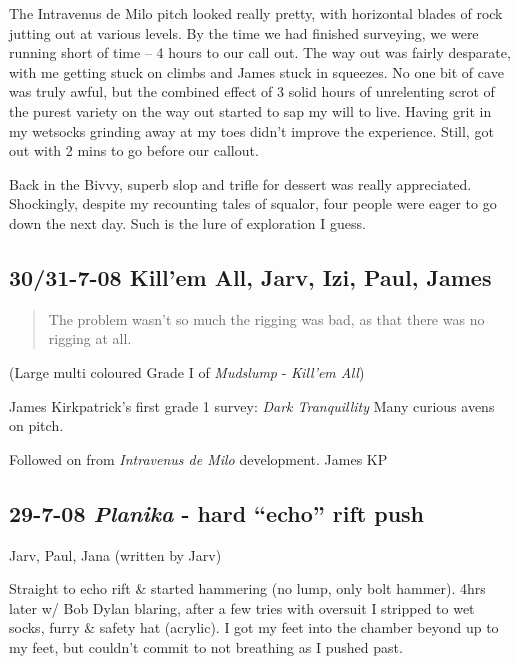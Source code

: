 The Intravenus de Milo pitch looked really pretty, with horizontal
blades of rock jutting out at various levels. By the time we had
finished surveying, we were running short of time -- 4 hours to our call
out. The way out was fairly desparate, with me getting stuck on climbs
and James stuck in squeezes. No one bit of cave was truly awful, but the
combined effect of 3 solid hours of unrelenting scrot of the purest
variety on the way out started to sap my will to live. Having grit in my
wetsocks grinding away at my toes didn't improve the experience. Still,
got out with 2 mins to go before our callout.

Back in the Bivvy, superb slop and trifle for dessert was really
appreciated. Shockingly, despite my recounting tales of squalor, four
people were eager to go down the next day. Such is the lure of
exploration I guess.


\hypertarget{killem-all-jarv-izi-paul-james}{%
\subsection{30/31-7-08 Kill'em All, Jarv, Izi, Paul,
James}\label{killem-all-jarv-izi-paul-james}}

\begin{quote}The problem wasn't so much the rigging was bad, as that there was no rigging at all.
\end{quote}


(Large multi coloured Grade I of \emph{Mudslump} - \emph{Kill'em All})

James Kirkpatrick's first grade 1 survey: \emph{Dark Tranquillity} Many
curious avens on pitch.

Followed on from \emph{Intravenus de Milo} development. James KP

\hypertarget{planika---hard-echo-rift-push}{%
\subsection{\texorpdfstring{29-7-08 \emph{Planika} - hard ``echo'' rift
push}{29-7-08 Planika - hard ``echo'' rift push}}\label{planika---hard-echo-rift-push}}

Jarv, Paul, Jana (written by Jarv)

Straight to echo rift \& started hammering (no lump, only bolt hammer).
4hrs later w/ Bob Dylan blaring, after a few tries with oversuit I
stripped to wet socks, furry \& safety hat (acrylic). I got my feet into
the chamber beyond up to my feet, but couldn't commit to not breathing
as I pushed past.

